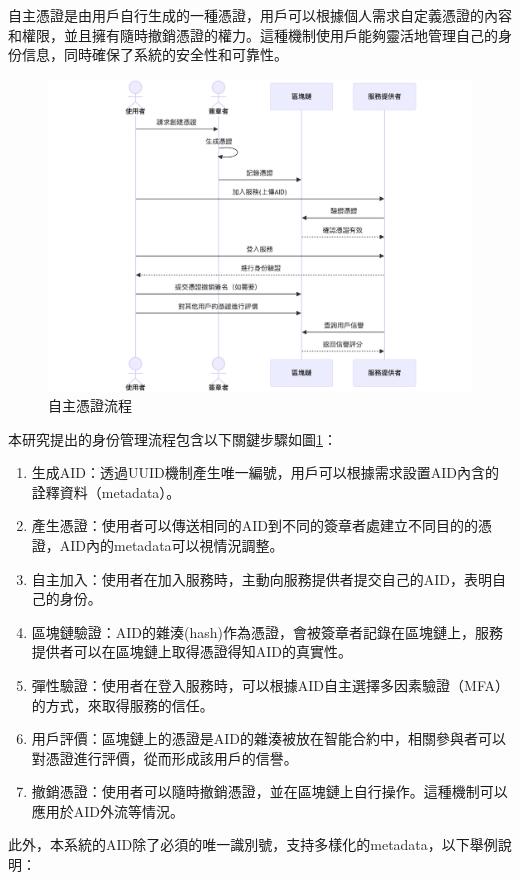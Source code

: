 自主憑證是由用戶自行生成的一種憑證，用戶可以根據個人需求自定義憑證的內容和權限，並且擁有隨時撤銷憑證的權力。這種機制使用戶能夠靈活地管理自己的身份信息，同時確保了系統的安全性和可靠性。
\begin{figure}
  \centering
  \includegraphics[width=\linewidth,keepaspectratio]{figures/flow-sc.png}
  \caption{自主憑證流程}
  \label{fig:flow-sc}
\end{figure}
本研究提出的身份管理流程包含以下關鍵步驟如圖\ref{fig:flow-sc}：
\begin{enumerate}
  \item 生成AID：透過UUID\cite{uuid}機制產生唯一編號，用戶可以根據需求設置AID內含的詮釋資料（metadata）。
  \item 產生憑證：使用者可以傳送相同的AID到不同的簽章者處建立不同目的的憑證，AID內的metadata可以視情況調整。
  \item 自主加入：使用者在加入服務時，主動向服務提供者提交自己的AID，表明自己的身份。
  \item 區塊鏈驗證：AID的雜湊(hash)作為憑證，會被簽章者記錄在區塊鏈上，服務提供者可以在區塊鏈上取得憑證得知AID的真實性。
  \item 彈性驗證：使用者在登入服務時，可以根據AID自主選擇多因素驗證（MFA）的方式，來取得服務的信任。
  \item 用戶評價：區塊鏈上的憑證是AID的雜湊被放在智能合約中，相關參與者可以對憑證進行評價，從而形成該用戶的信譽。
  \item 撤銷憑證：使用者可以隨時撤銷憑證，並在區塊鏈上自行操作。這種機制可以應用於AID外流等情況。
\end{enumerate}
此外，本系統的AID除了必須的唯一識別號，支持多樣化的metadata，以下舉例說明：
